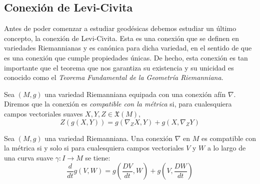 \subsection{Conexión de Levi-Civita}
\label{Subsección: Conexión de Levi-Civita}
Antes de poder comenzar a estudiar geodésicas debemos estudiar un último concepto, la conexión de Levi-Civita. Esta es una conexión que se definen en variedades Riemannianas y es canónica para dicha variedad, en el sentido de que es una conexión que cumple propiedades únicas. De hecho, esta conexión es tan importante que el teorema que nos garantiza su existencia y su unicidad es conocido como el \textit{Teorema Fundamental de la Geometría Riemanniana}.

\begin{definition}
	Sea $(M,g)$ una variedad Riemanniana equipada con una conexión afín $\nabla$. Diremos que la conexión es \textit{compatible con la métrica} si, para cualesquiera campos vectoriales suaves $X,Y,Z \in \mathfrak{X}(M)$,
	\[
		Z(g(X,Y)) = g(\nabla_{Z}X, Y) + g(X,\nabla_{Z}Y)
	\]
\end{definition}

\begin{lemma}
	Sea $(M,g)$ una variedad Riemanniana. Una conexión $\nabla$ en $M$ es compatible con la métrica si y solo si para cualesquiera campos vectoriales $V$ y $W$ a lo largo de una curva suave $\gamma: I \to M$ se tiene:
	\[
		\frac{d}{dt}g(V,W) = g\left(\frac{DV}{dt},W \right) +g\left(V, \frac{DW}{dt} \right)
	\]
\end{lemma}

